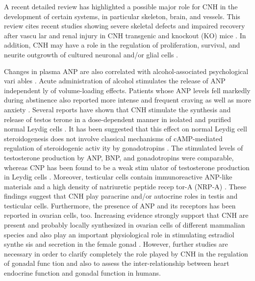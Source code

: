 \documentclass[14pt,a4paper,onecolumn]{extarticle}
\begin{document}
A recent detailed review \citep{107} has highlighted a possible major role for CNH in the development of certain systems, in particular skeleton, brain, and vessels. This review cites recent studies showing severe skeletal defects and impaired recovery after vascu lar and renal injury in CNH transgenic and knockout (KO) mice \citep{108}. In addition, CNH may have a role in the regulation of proliferation, survival, and neurite outgrowth of cultured neuronal and/or glial cells \citep{108}.

Changes in plasma ANP are also correlated with alcohol-associated psychological vari ables \citep{108}. Acute administration of alcohol stimulates the release of ANP independent ly of volume-loading effects. Patients whose ANP levels fell markedly during abstinence also reported more intense and frequent craving as well as more anxiety \citep{108}.  Several reports have shown that CNH stimulate the synthesis and release of testos terone in a dose-dependent manner in isolated and purified normal Leydig cells \citep{109 112}. It has been suggested that this effect on normal Leydig cell steroidogenesis does not involve classical mechanisms of cAMP-mediated regulation of steroidogenic activ ity by gonadotropins \citep{112}. The stimulated levels of testosterone production by ANP, BNP, and gonadotropins were comparable, whereas CNP has been found to be a weak stim ulator of testosterone production in Leydig cells \citep{112}. Moreover, testicular cells contain immunoreactive ANP-like materials and a high density of natriuretic peptide recep tor-A (NRP-A) \citep{112}. These findings suggest that CNH play paracrine and/or autocrine roles in testis and testicular cells. Furthermore, the presence of ANP and its receptors has been reported in ovarian cells, too. Increasing evidence strongly support that CNH are present and probably locally synthesized in ovarian cells of different mammalian species and also play an important physiological role in stimulating estradiol synthe sis and secretion in the female gonad \citep{112} \citep{113} \citep{114} \citep{115}. However, further studies are necessary in order to clarify completely the role played by CNH in the regulation of gonadal func tion and also to assess the inter-relationship between heart endocrine function and gonadal function in humans.
\end{document}
